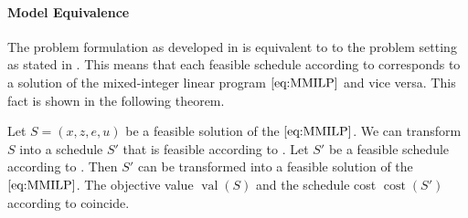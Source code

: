 \newpage

\paragraph{Model Equivalence} \parfill

The problem formulation as developed in  is equivalent to to the problem setting as stated in . This means that each feasible schedule according to  corresponds to a solution of the mixed-integer linear program $\eqref{eq:MMILP}$ and vice versa. This fact is shown in the following theorem.

\begin{theorem}
\label{thm:equivalence_setting_mmilp}

Let ${S=\left(x,z,e,u\right)}$ be a feasible solution of the $\eqref{eq:MMILP}$. We can transform $S$ into a schedule $S'$ that is feasible according to . Let $S'$ be a feasible schedule according to . Then $S'$ can be transformed into a feasible solution of the $\eqref{eq:MMILP}$. The objective value $\operatorname{val}(S)$ and the schedule cost $\operatorname{cost}\left(S'\right)$ according to  coincide.

\end{theorem}

